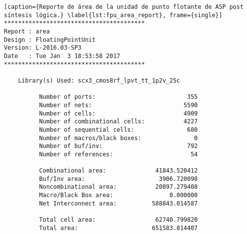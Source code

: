 \begin{lstlisting}[caption={Reporte de área de la unidad de punto flotante de ASP post síntesis lógica.} \label{lst:fpu_area_report}, frame={single}]
****************************************
Report : area
Design : FloatingPointUnit
Version: L-2016.03-SP3
Date   : Tue Jan  3 18:53:58 2017
****************************************

	Library(s) Used: scx3_cmos8rf_lpvt_tt_1p2v_25c

          Number of ports:                          355
          Number of nets:                          5590
          Number of cells:                         4909
          Number of combinational cells:           4227
          Number of sequential cells:               680
          Number of macros/black boxes:               0
          Number of buf/inv:                        792
          Number of references:                      54

          Combinational area:              41843.520412
          Buf/Inv area:                     3906.720098
          Noncombinational area:           20897.279408
          Macro/Black Box area:                0.000000
          Net Interconnect area:          588843.014587

          Total cell area:                 62740.799820
          Total area:                     651583.814407
\end{lstlisting}

\newpage

